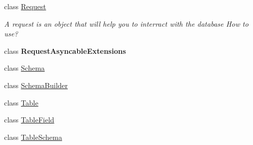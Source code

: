 \begin{DoxyCompactItemize}
class \mbox{\hyperlink{class_d_g_tools_1_1_database_1_1_request}{Request}}
\begin{DoxyCompactList}\small\item\em A request is an object that will help you to interract with the database How to use? \end{DoxyCompactList}\item 
class {\bfseries Request\+Asyncable\+Extensions}
\item 
class \mbox{\hyperlink{class_d_g_tools_1_1_database_1_1_schema}{Schema}}
\item 
class \mbox{\hyperlink{class_d_g_tools_1_1_database_1_1_schema_builder}{Schema\+Builder}}
\item 
class \mbox{\hyperlink{class_d_g_tools_1_1_database_1_1_table}{Table}}
\item 
class \mbox{\hyperlink{class_d_g_tools_1_1_database_1_1_table_field}{Table\+Field}}
\item 
class \mbox{\hyperlink{class_d_g_tools_1_1_database_1_1_table_schema}{Table\+Schema}}
\end{DoxyCompactItemize}
